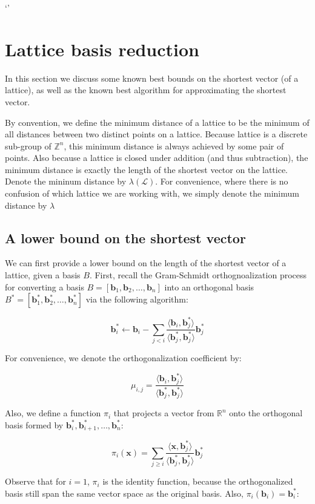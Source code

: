 \documentclass[letterpaper,12pt]{article}
\begin{document}
`'
\section{Lattice basis reduction}
In this section we discuss some known best bounds on the shortest vector (of a lattice), as well as the known best algorithm for approximating the shortest vector.

By convention, we define the minimum distance of a lattice to be the minimum of all distances between two distinct points on a lattice. Because lattice is a discrete sub-group of $\mathbb{Z}^n$, this minimum distance is always achieved by some pair of points. Also because a lattice is closed under addition (and thus subtraction), the minimum distance is exactly the length of the shortest vector on the lattice. Denote the mininum distance by $\lambda(\mathcal{L})$. For convenience, where there is no confusion of which lattice we are working with, we simply denote the minimum distance by $\lambda$

\subsection{A lower bound on the shortest vector}
We can first provide a lower bound on the length of the shortest vector of a lattice, given a basis $B$. First, recall the Gram-Schmidt orthognoalization process for converting a basis $B = [\mathbf{b}_1, \mathbf{b}_2, \ldots, \mathbf{b}_n]$ into an orthogonal basis $B^\ast = [\mathbf{b}_1^\ast, \mathbf{b}_2^\ast, \ldots, \mathbf{b}_n^\ast]$ via the following algorithm:

$$
\mathbf{b}_i^\ast \leftarrow \mathbf{b}_i - \sum_{j<i}\frac{\langle \mathbf{b}_i, \mathbf{b}_j^*\rangle}{\langle \mathbf{b}_j^*, \mathbf{b}_j^*\rangle}\mathbf{b}_j^\ast
$$

For convenience, we denote the orthogonalization coefficient by:

$$
\mu_{i, j} = \frac{\langle \mathbf{b}_i, \mathbf{b}_j^*\rangle}{\langle \mathbf{b}_j^*, \mathbf{b}_j^*\rangle}
$$

Also, we define a function $\pi_i$ that projects a vector from $\mathbb{R}^n$ onto the orthogonal basis formed by $\mathbf{b}_i^\ast, \mathbf{b}_{i+1}^\ast, \ldots, \mathbf{b}_n^\ast$:

$$
\pi_i(\mathbf{x}) = \sum_{j\geq i}\frac{\langle \mathbf{x}, \mathbf{b}_j^\ast\rangle}{\langle \mathbf{b}_j^\ast, \mathbf{b}_j^\ast \rangle}\mathbf{b}_j^\ast
$$

Observe that for $i = 1$, $\pi_i$ is the identity function, because the orthogonalized basis still span the same vector space as the original basis. Also, $\pi_i(\mathbf{b}_i) = \mathbf{b}_i^\ast$:
\end{document}
